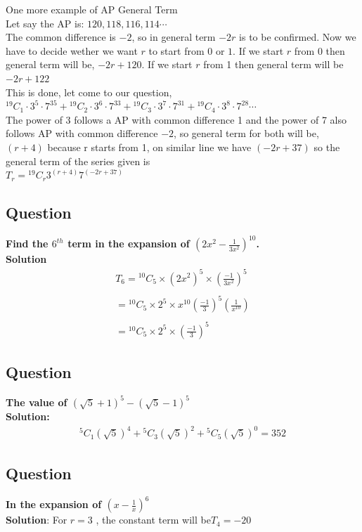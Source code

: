 \documentclass[12pt]{article}
\begin{document}
One more example of AP General Term\\
Let say the AP is: $120, 118, 116,114 \cdots$\\
The common difference is $-2$, so in general term $-2r$ is to be confirmed. Now we have to decide wether we want $r$ to start from $0$ or $1$. If we start $r$ from 0 then general term will be, $-2r+120$. If we start $r$ from 1 then general term will be $-2r+122$ \\
This is done, let come to our question, \\
${}^{19}C_{1}\cdot3^{5}\cdot7^{35}+{}^{19}C_{2}\cdot3^{6}\cdot7^{33}+{}^{19}C_{3}\cdot3^{7}\cdot7^{31}+{}^{19}C_{4}\cdot3^{8}\cdot7^{28}\cdots$ \\
The power of 3 follows a AP with common difference 1 and the power of 7 also follows AP with common difference $-2$, so general term for both will be, $(r+4)$ because r starts from 1, on similar line we have $(-2r+37)$ so the general term of the series given is\\
$T_r = {}^{19}C_{r}3^{(r+4)}7^{(-2r+37)}$
\subsection*{Question}
\textbf{Find the $6^{th}$ term in the expansion of $\left(2x^2-\frac{1}{3x^2}\right)^{10}$.}\\
\textbf{Solution} \\
\[
\begin{aligned}
T_6 = {}^{10}C_{5}\times(2x^2)^5\times\left(\frac{-1}{3x^2}\right)^5 \\ \\
={}^{10}C_{5} \times2^5\times x^{10} \left(\frac{-1}{3}\right)^5(\frac{1}{x^{10}})\\ \\
={}^{10}C_{5}\times2^{5}\times \left(\frac{-1}{3}\right)^5
\end{aligned}
\]

\subsection*{Question}
\textbf{The value of $(\sqrt{5}+1)^5-(\sqrt{5}-1)^5$} \\
\textbf{Solution: }\\
\[\begin{aligned}
{}^{5}C_{1}(\sqrt{5})^4+{}^{5}C_{3}(\sqrt{5})^2+{}^{5}C_{5}(\sqrt{5})^0 = 352
\end{aligned}
\]
\subsection*{Question}
\textbf{In the expansion of $\left(x-\frac{1}{x}\right)^6$}\\
\textbf{Solution}: For $r=3$ , the constant term will be$T_4 = -20$
\end{document}
